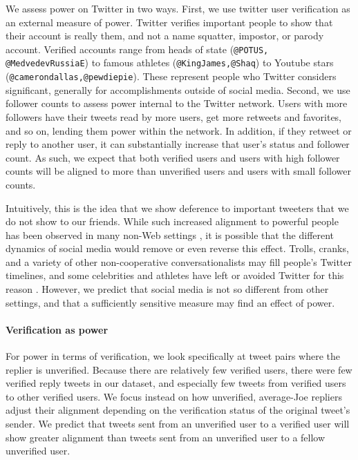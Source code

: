 \documentclass{acm_proc_article-sp}
\begin{document}
We assess power on Twitter in two ways. First, we use twitter user verification as an external measure of power.  Twitter verifies important people to show that their account is really them, and not a name squatter, impostor, or parody account.  Verified accounts range from heads of state (\texttt{@POTUS, @MedvedevRussiaE}) to famous athletes (\texttt{@KingJames,@Shaq}) to Youtube stars (\texttt{@camerondallas,@pewdiepie}).  These represent people who Twitter considers significant, generally for accomplishments outside of social media.  Second, we use follower counts to assess power internal to the Twitter network.  Users with more followers have their tweets read by more users, get more retweets and favorites, and so on, lending them power within the network.  In addition, if they retweet or reply to another user, it can substantially increase that user's status and follower count.  As such, we expect that both verified users and users with high follower counts will be aligned to more than unverified users and users with small follower counts.

Intuitively, this is the idea that we show deference to important tweeters that we do not show to our friends. While such increased alignment to powerful people has been observed in many non-Web settings \cite{?}, it is possible that the different dynamics of social media would remove or even reverse this effect.  Trolls, cranks, and a variety of other non-cooperative conversationalists may fill people's Twitter timelines, and some celebrities and athletes have left or avoided Twitter for this reason \cite{?}.  However, we predict that social media is not so different from other settings, and that a sufficiently sensitive measure may find an effect of power.

\paragraph{Verification as power} For power in terms of verification, we look specifically at tweet pairs where the replier is unverified.  Because there are relatively few verified users, there were few verified reply tweets in our dataset, and especially few tweets from verified users to other verified users. We focus instead on how unverified, average-Joe repliers adjust their alignment depending on the verification status of the original tweet's sender.  We predict that tweets sent from an unverified user to a verified user will show greater alignment than tweets sent from an unverified user to a fellow unverified user.  
\end{document}
